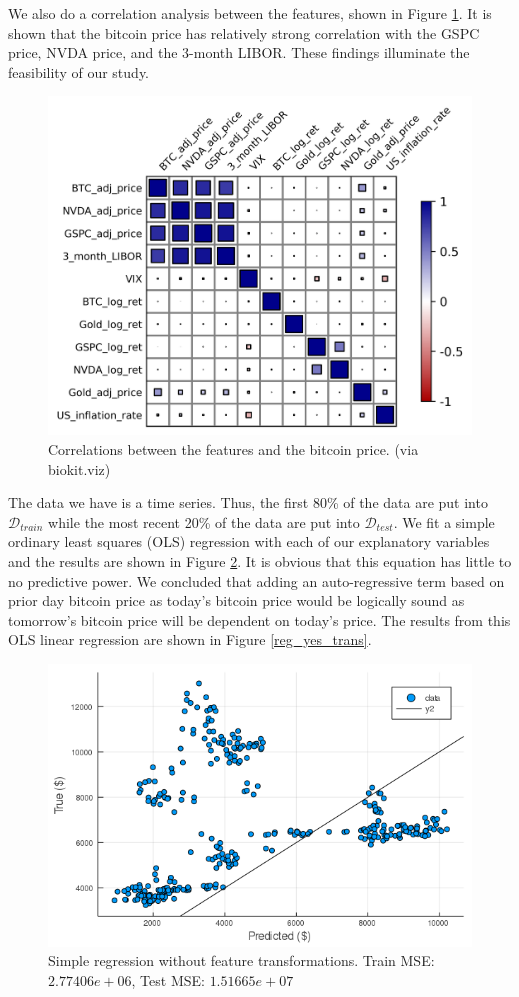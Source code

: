 \documentclass[9pt,twocolumn,twoside]{ilcss}
\begin{document}
We also do a correlation analysis between the features, shown in Figure \ref{corr}. It is shown that the bitcoin price has relatively strong correlation with the GSPC price, NVDA price, and the 3-month LIBOR. These findings illuminate the feasibility of our study. 

\begin{figure}[h]
\centering
\includegraphics[width=0.8\linewidth]{new_heat_map.png}
\caption{Correlations between the features and the bitcoin price. (via biokit.viz)}
\label{corr}
\end{figure}

The data we have is a time series. Thus, the first 80\% of the data are put into $\mathcal{D}_{train}$ while the most recent 20\% of the data are put into $\mathcal{D}_{test}$. We fit a simple ordinary least squares (OLS) regression with each of our explanatory variables and the results are shown in Figure \ref{reg_no_trans}. It is obvious that this equation has little to no predictive power. We concluded that adding an auto-regressive term based on prior day bitcoin price as today's bitcoin price would be logically sound as tomorrow's bitcoin price will be dependent on today's price. The results from this OLS linear regression are shown in Figure \ref{reg_yes_trans}.

\begin{figure}[h]
\centering
\includegraphics[width=.75\linewidth]{Regression_w_o_lag.png}
\caption{Simple regression without feature transformations. Train MSE: $2.77406e+06$, Test MSE: $1.51665e+07$}
\label{reg_no_trans}
\end{figure}
\end{document}
